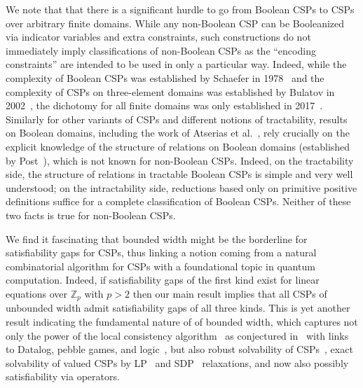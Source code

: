 \documentclass[11pt,letter]{article}
\begin{document}
We note that that there is a significant hurdle to go from Boolean CSPs to CSPs
over arbitrary finite domains. While any non-Boolean CSP can be Booleanized via
indicator variables and extra constraints, such constructions do not
immediately imply classifications of non-Boolean CSPs as the ``encoding
constraints'' are intended to be used in only a particular way. Indeed, while
the complexity of Boolean CSPs was established by Schaefer in
1978~\cite{Schaefer78:stoc} and the complexity of CSPs on three-element domains
was established by Bulatov in 2002~\cite{Bulatov02:focs,Bulatov06:jacm}, the
dichotomy for all finite domains was only established in
2017~\cite{Bulatov17:focs,Zhuk17:focs,Zhuk20:jacm}.
Similarly for other variants of CSPs and different notions of tractability,
results on Boolean domains, including the work of Atserias et
al.~\cite{AKS19:jcss}, rely crucially on the explicit knowledge of the structure
of relations on Boolean domains (established by Post~\cite{Post41}), which is not known for non-Boolean CSPs.
Indeed, on the tractability side, the structure of relations in tractable Boolean CSPs is simple and very well understood; on the intractability side, reductions based only on primitive positive definitions suffice for a complete classification of Boolean CSPs. Neither of these two facts is true for non-Boolean CSPs.

We find it fascinating that bounded width might be the borderline for
satisfiability gaps for CSPs, thus linking a notion coming from a
natural combinatorial algorithm for CSPs with a foundational topic in quantum
computation. 
Indeed, if satisfiability gaps of the first kind exist for linear equations over
$\mathbb{Z}_p$ with $p>2$ then our main result implies that all CSPs of
unbounded width admit satisfiability gaps of all three kinds.
This is yet another result indicating the fundamental nature of of bounded
width, which captures not only the power of the local consistency
algorithm~\cite{LaroseZadori07:au,Maroti2008existence,Bulatov09:width,Barto14:local}
as conjectured in~\cite{Feder98:monotone} with links to Datalog, pebble games,
and logic~\cite{Feder98:monotone,Kolaitis00:jcss}, but also robust solvability
of CSPs~\cite{Barto16:sicomp}, exact solvability of valued CSPs by
LP~\cite{tz17:sicomp} and SDP~\cite{tz18} relaxations, and now also
possibly satisfiability via operators.
\end{document}
